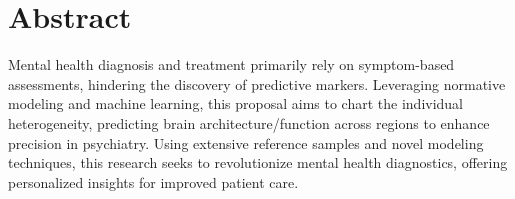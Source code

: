 \section{Abstract}
Mental health diagnosis and treatment primarily rely on symptom-based assessments, hindering the discovery of predictive markers. Leveraging normative modeling and machine learning, this proposal aims to chart the individual heterogeneity, predicting brain architecture/function across regions to enhance precision in psychiatry. Using extensive reference samples and novel modeling techniques, this research seeks to revolutionize mental health diagnostics, offering personalized insights for improved patient care.
